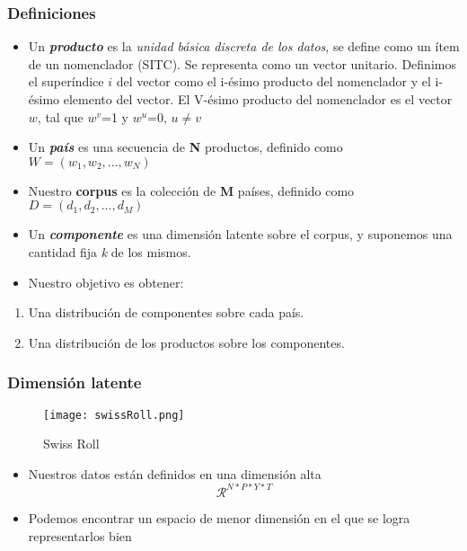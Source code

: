 \documentclass[class=article, crop=false]{standalone}
\begin{document}
	
\subsubsection{Definiciones}

\begin{itemize}
\item
Un \textbf{\emph{producto}} es la \emph{unidad básica discreta de los
	datos}, se define como un ítem de un nomenclador (SITC). Se representa
como un vector unitario. Definimos el superíndice \(i\) del vector
como el i-ésimo producto del nomenclador y el i-ésimo elemento del
vector. El V-ésimo producto del nomenclador es el vector \(w\), tal
que \(w^v\)=1 y \(w^u\)=0, \(u\neq v\)
\item
Un \textbf{\emph{país}} es una secuencia de \textbf{N} productos,
definido como \(W= (w_1, w_2, ..., w_N)\)
\item
Nuestro \textbf{corpus} es la colección de \textbf{M} países, definido
como \(D = (d_1, d_2,..., d_M)\)
\item
Un \textbf{\emph{componente}} es una dimensión latente sobre el
corpus, y suponemos una cantidad fija \emph{k} de los mismos.
\item
Nuestro objetivo es obtener:
\end{itemize}

\begin{enumerate}
\def\labelenumi{\arabic{enumi}.}
\item
Una distribución de componentes sobre cada país.
\item
Una distribución de los productos sobre los componentes.
\end{enumerate}


\subsubsection{Dimensión latente}

\begin{figure}
\centering
\texttt{[image: swissRoll.png]}
\caption{Swiss Roll}
\end{figure}

\begin{itemize}
\item
Nuestros datos están definidos en una dimensión alta
\[\mathcal{R}^{N*P*Y*T}\]
\item
Podemos encontrar un espacio de menor dimensión en el que se logra
representarlos bien
\end{itemize}
\end{document}
